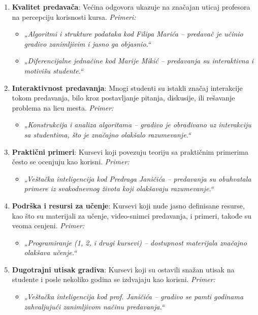 \documentclass{article}
\begin{document}
\begin{enumerate}
    \item \textbf{Kvalitet predavača}: Većina odgovora ukazuje na značajan uticaj profesora na percepciju korisnosti kursa. 
    \textit{Primeri:} 
    \begin{itemize}
        \item \emph{„Algoritmi i strukture podataka kod Filipa Marića – predavač je učinio gradivo zanimljivim i jasno ga objasnio.“}
        \item \emph{„Diferencijalne jednačine kod Marije Mikić – predavanja su interaktivna i motivišu studente.“}
    \end{itemize}

    \item \textbf{Interaktivnost predavanja}: Mnogi studenti su istakli značaj interakcije tokom predavanja, bilo kroz postavljanje pitanja, diskusije, ili rešavanje problema na licu mesta.  
    \textit{Primer:} 
    \begin{itemize}
        \item \emph{„Konstrukcija i analiza algoritama – gradivo je obrađivano uz interakciju sa studentima, što je značajno olakšalo razumevanje.“}
    \end{itemize}

    \item \textbf{Praktični primeri}: Kursevi koji povezuju teoriju sa praktičnim primerima često se ocenjuju kao korisni.  
    \textit{Primer:} 
    \begin{itemize}
        \item \emph{„Veštačka inteligencija kod Predraga Janičića – predavanja su obuhvatala primere iz svakodnevnog života koji olakšavaju razumevanje.“}
    \end{itemize}

    \item \textbf{Podrška i resursi za učenje}: Kursevi koji nude jasno definisane resurse, kao što su materijali za učenje, video-snimci predavanja, i primeri, takođe su veoma cenjeni.  
    \textit{Primer:} 
    \begin{itemize}
        \item \emph{„Programiranje (1, 2, i drugi kursevi) – dostupnost materijala značajno olakšava učenje.“}
    \end{itemize}

    \item \textbf{Dugotrajni utisak gradiva}: Kursevi koji su ostavili snažan utisak na studente i posle nekoliko godina se izdvajaju kao korisni.  
    \textit{Primer:} 
    \begin{itemize}
        \item \emph{„Veštačka inteligencija kod prof. Janičića – gradivo se pamti godinama zahvaljujući zanimljivom načinu predavanja.“}
    \end{itemize}
\end{enumerate}
\end{document}
